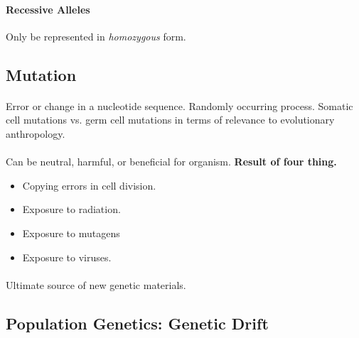 \documentclass{article}
\begin{document}
	\paragraph{Recessive Alleles} Only be represented in \emph{homozygous} form.
	\subsection{Mutation}
	\paragraph{} Error or change in a nucleotide sequence. Randomly occurring process. Somatic cell mutations vs. germ cell mutations in terms of relevance to evolutionary anthropology.
	\paragraph{} Can be neutral, harmful, or beneficial for organism.
	\newline \textbf{Result of four thing.}
	\begin{itemize}
		\item Copying errors in cell division.
		\item Exposure to radiation.
		\item Exposure to mutagens
		\item Exposure to viruses.
	\end{itemize}
	\paragraph{}Ultimate source of new genetic materials.
	\subsection{Population Genetics: Genetic Drift}
\end{document}
